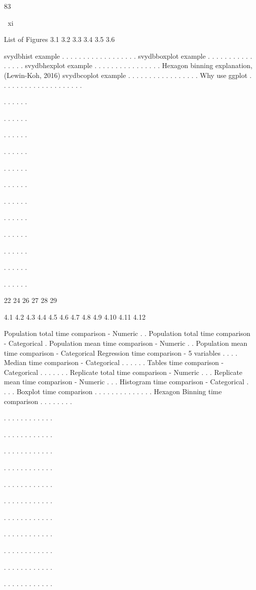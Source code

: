 83

xi

List of Figures
3.1
3.2
3.3
3.4
3.5
3.6

svydbhist example . . . . . . . . . . . . . . . . . .
svydbboxplot example . . . . . . . . . . . . . . . .
svydbhexplot example . . . . . . . . . . . . . . . .
Hexagon binning explanation, (Lewin-Koh, 2016)
svydbcoplot example . . . . . . . . . . . . . . . . .
Why use ggplot . . . . . . . . . . . . . . . . . . . .

.
.
.
.
.
.

.
.
.
.
.
.

.
.
.
.
.
.

.
.
.
.
.
.

.
.
.
.
.
.

.
.
.
.
.
.

.
.
.
.
.
.

.
.
.
.
.
.

.
.
.
.
.
.

.
.
.
.
.
.

.
.
.
.
.
.

.
.
.
.
.
.

22
24
26
27
28
29

4.1
4.2
4.3
4.4
4.5
4.6
4.7
4.8
4.9
4.10
4.11
4.12

Population total time comparison - Numeric . .
Population total time comparison - Categorical .
Population mean time comparison - Numeric . .
Population mean time comparison - Categorical
Regression time comparison - 5 variables . . . .
Median time comparison - Categorical . . . . . .
Tables time comparison - Categorical . . . . . . .
Replicate total time comparison - Numeric . . .
Replicate mean time comparison - Numeric . . .
Histogram time comparison - Categorical . . . .
Boxplot time comparison . . . . . . . . . . . . . .
Hexagon Binning time comparison . . . . . . . .

.
.
.
.
.
.
.
.
.
.
.
.

.
.
.
.
.
.
.
.
.
.
.
.

.
.
.
.
.
.
.
.
.
.
.
.

.
.
.
.
.
.
.
.
.
.
.
.

.
.
.
.
.
.
.
.
.
.
.
.

.
.
.
.
.
.
.
.
.
.
.
.

.
.
.
.
.
.
.
.
.
.
.
.

.
.
.
.
.
.
.
.
.
.
.
.

.
.
.
.
.
.
.
.
.
.
.
.

.
.
.
.
.
.
.
.
.
.
.
.

.
.
.
.
.
.
.
.
.
.
.
.

